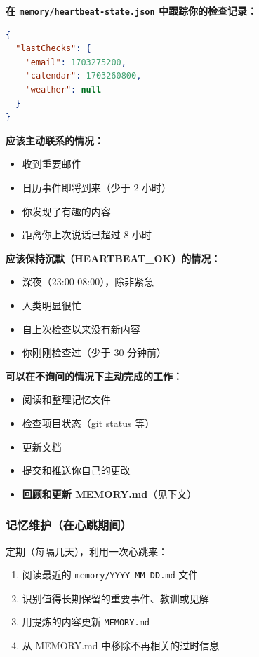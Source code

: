 \textbf{在 \texttt{memory/heartbeat-state.json} 中跟踪你的检查记录：}

\begin{lstlisting}[language=json]
{
  "lastChecks": {
    "email": 1703275200,
    "calendar": 1703260800,
    "weather": null
  }
}
\end{lstlisting}


\textbf{应该主动联系的情况：}

\begin{itemize}
  \item 收到重要邮件
  \item 日历事件即将到来（少于 2 小时）
  \item 你发现了有趣的内容
  \item 距离你上次说话已超过 8 小时
\end{itemize}


\textbf{应该保持沉默（HEARTBEAT\_OK）的情况：}

\begin{itemize}
  \item 深夜（23:00-08:00），除非紧急
  \item 人类明显很忙
  \item 自上次检查以来没有新内容
  \item 你刚刚检查过（少于 30 分钟前）
\end{itemize}


\textbf{可以在不询问的情况下主动完成的工作：}

\begin{itemize}
  \item 阅读和整理记忆文件
  \item 检查项目状态（git status 等）
  \item 更新文档
  \item 提交和推送你自己的更改
  \item \textbf{回顾和更新 MEMORY.md}（见下文）
\end{itemize}


\subsubsection{记忆维护（在心跳期间）}


定期（每隔几天），利用一次心跳来：

\begin{enumerate}
  \item 阅读最近的 \texttt{memory/YYYY-MM-DD.md} 文件
  \item 识别值得长期保留的重要事件、教训或见解
  \item 用提炼的内容更新 \texttt{MEMORY.md}
  \item 从 MEMORY.md 中移除不再相关的过时信息
\end{enumerate}


